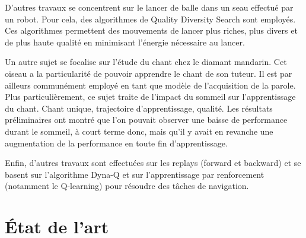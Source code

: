 \documentclass[draft]{llncs}
\begin{document}


D'autres travaux se concentrent sur le lancer de balle dans un seau effectué par un robot.
Pour cela, des algorithmes de Quality Diversity Search sont employés.
Ces algorithmes permettent des mouvements de lancer plus riches, plus divers et de plus haute qualité en minimisant l'énergie nécessaire au lancer.

Un autre sujet se focalise sur l'étude du chant chez le diamant mandarin.
Cet oiseau a la particularité de pouvoir apprendre le chant de son tuteur.
Il est par ailleurs communément employé en tant que modèle de l'acquisition de la parole.
Plus particulièrement, ce sujet traite de l'impact du sommeil sur l'apprentissage du chant.
Chant unique, trajectoire d'apprentissage, qualité.
Les résultats préliminaires ont montré que l'on pouvait observer une baisse de performance durant le sommeil, à court terme donc, mais qu'il y avait en revanche une  augmentation de la performance en toute fin d'apprentissage.

Enfin, d'autres travaux sont effectuées sur les replays (forward et backward) et se basent sur l'algorithme Dyna-Q et sur l'apprentissage par renforcement (notamment le Q-learning) pour résoudre des tâches de navigation.


\section{\'Etat de l'art}

\end{document}
